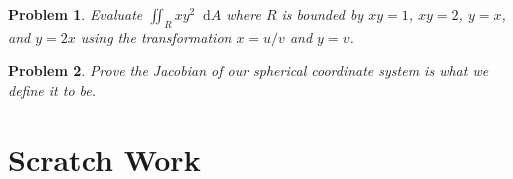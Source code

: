 \documentclass[11pt]{article}
\newtheorem{problem}{Problem}
\newcommand*\dif{\mathop{}\!\mathrm{d}}
\begin{document}
\vspace{9cm}

\begin{problem}
    Evaluate $\iint_R xy^2 \dif{A}$ where $R$ is bounded by $xy = 1$, $xy= 2$, $y = x$, and $y = 2x$ using the transformation $x = u/v$ and $y = v$.
\end{problem}

\vspace{9 cm}

\begin{problem}
    Prove the Jacobian of our spherical coordinate system is what we define it to be.
\end{problem}

\newpage

\section{Scratch Work}
\end{document}
